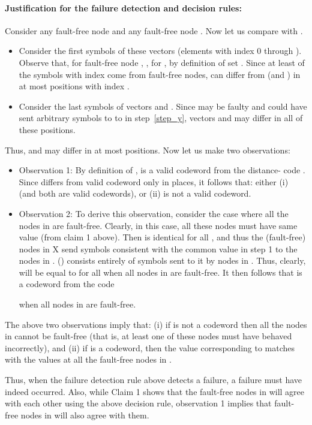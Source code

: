 \documentclass[12pt]{article}
\begin{document}
\paragraph{Justification for the failure detection and decision rules:}
Consider any fault-free node  and any fault-free node .
Now let us compare  with .
\begin{itemize}
\item Consider the first  symbols of these vectors (elements with
index 0 through ). Observe that, for fault-free node ,
, for , by definition of set .
Since at least  of the symbols with index  come from
fault-free nodes,  can differ from  (and ) in at most
 positions with index .
\item Consider the last  symbols of vectors  and .
Since  may be faulty and could have sent arbitrary  symbols to 
to  in step~\ref{step_y}, vectors  and  may differ
in all of these  positions.
\end{itemize}
Thus,  and  may differ in at most  positions. 
Now let us make two observations:
\begin{itemize}
\item
Observation 1:
By definition of ,  is a valid codeword from the
distance- code . 
Since  differs from valid codeword  only in  places,
it follows that: either (i) 
(and both are valid codewords), or (ii)  is not a valid codeword.

\item
{Observation 2:}
To derive this observation,
consider the case where all the nodes in  are fault-free.
Clearly, in this case, all these nodes must have same value (from
claim 1 above). Then  is identical for all ,
and thus the (fault-free) nodes in X send symbols consistent with
the common value in step 1 to the nodes in .
 () consists entirely of symbols sent to it
by nodes in . Thus, clearly,  will be equal to  for all
 when all nodes in  are fault-free.
It then follows that  is a codeword from the  code

when all nodes in  are fault-free.
\end{itemize}
The above two observations imply that: (i) if  is not
a codeword then all the nodes in  cannot be fault-free (that is,
at least one of these nodes must have behaved incorrectly), and
(ii) if  is a codeword, then the value corresponding to 
matches with the values at all the fault-free nodes in .  

Thus, when the failure detection rule above detects a failure,
a failure must have indeed occurred. Also, while Claim 1
shows that the fault-free nodes in  will agree with each other
using the above decision rule, observation 1 implies that
fault-free nodes in  will also agree with them.
\end{document}
